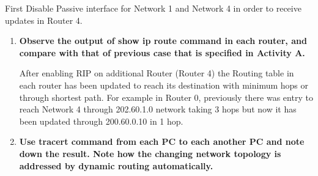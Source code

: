 \documentclass[a4paper,11pt]{article}
\begin{document}
First Disable Passive interface for Network 1 and Network 4 in order to receive updates in Router 4.



\begin{enumerate}

    \item \textbf{Observe the output of show ip route command in each router, and compare with that of
              previous case that is specified in Activity A.}




          After enabling RIP on additional Router (Router 4) the Routing table in each router has been updated to reach its destination with minimum hops or through shortest path. For example in Router 0, previously there was entry to reach Network 4 through 202.60.1.0 network taking 3 hops but now it has been updated through 200.60.0.10 in 1 hop.


    \item \textbf{Use tracert command from each PC to each another PC and note down the result. Note how
              the changing network topology is addressed by dynamic routing automatically.}





\end{enumerate}
\end{document}
